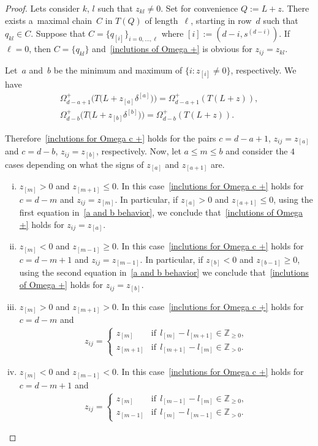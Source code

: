 \begin{proof}
Lets consider $k$, $l$ such that $z_{kl}\neq 0$.
Set for convenience $Q:=L+z$.
There exists a~maximal chain~$C$ in $T(Q)$ of length~$\ell$, starting in row~$d$ such that $q_{kl}\in C$.
Suppose that $C=\{q_{[i]}\}_{i=0,\ldots,\ell}$ where $[i]:=(d-i,s^{(d-i)})$.
If $\ell=0$, then $C=\{q_{kl}\}$ and~\eqref{inclutions of Omega +} is obvious for $z_{ij}=z_{kl}$.

Let~$a$ and~$b$ be the minimum and maximum of $\{i:z_{[i]}\neq 0\}$, respectively.
We have
\begin{gather}
\Omega^{+}_{d-a+1}\big(T\big(L+z_{[a]}\delta^{[a]}\big)\big)=\Omega^{+}_{d-a+1}(T(L+z)),\nonumber
\\
\Omega^{+}_{d-b}\big(T\big(L+z_{[b]}\delta^{[b]}\big)\big)=\Omega^{+}_{d-b}(T(L+z)).\label{a and b behavior}
\end{gather}

Therefore~\eqref{inclutions for Omega c +} holds for the pairs $c=d-a+1$, $z_{ij}=z_{[a]}$ and $c=d-b$, $z_{ij}=z_{[b]}$,
respectively.
Now, let $a\leq m\leq b$ and consider the $4$ cases depending on what the signs of $z_{[a]}$ and $z_{[a+1]}$ are.
\begin{enumerate}[(i)]\itemsep=0pt
\item $z_{[m]}>0$ and $z_{[m+1]}\leq 0$.
In this case~\eqref{inclutions for Omega c +} holds for $c=d-m$ and $z_{ij}=z_{[m]}$.
In particular, if $z_{[a]}>0$ and $z_{[a+1]}\leq 0$, using the f\/irst equation in~\eqref{a and b behavior}, we conclude
that~\eqref{inclutions of Omega +} holds for $z_{ij}=z_{[a]}$.
\item $z_{[m]}<0$ and $z_{[m-1]}\geq 0$.
In this case~\eqref{inclutions for Omega c +} holds for $c=d-m+1$ and $z_{ij}=z_{[m-1]}$.
In particular, if $z_{[b]}<0$ and $z_{[b-1]}\geq 0$, using the second equation in~\eqref{a and b behavior} we conclude
that~\eqref{inclutions of Omega +} holds for $z_{ij}=z_{[b]}$.
\item $z_{[m]}>0$ and $z_{[m+1]}> 0$.
In this case~\eqref{inclutions for Omega c +} holds for $c=d-m$ and
\begin{gather*}
z_{ij}=
\begin{cases}
z_{[m]} & \text{if} \ \ l_{[m]}-l_{[m+1]}\in\mathbb{Z}_{\geq 0},
\\
z_{[m+1]} & \text{if} \ \ l_{[m+1]}-l_{[m]}\in\mathbb{Z}_{> 0}.
\end{cases}
\end{gather*}
\item $z_{[m]}<0$ and $z_{[m-1]}< 0$.
In this case~\eqref{inclutions for Omega c +} holds for $c=d-m+1$ and
\begin{gather*}
z_{ij}=
\begin{cases}
z_{[m]} & \text{if} \ \  l_{[m-1]}-l_{[m]}\in\mathbb{Z}_{\geq 0},
\\
z_{[m-1]} & \text{if} \ \ l_{[m]}-l_{[m-1]}\in\mathbb{Z}_{> 0}.
\end{cases}
\end{gather*}
\end{enumerate}


\end{proof}
